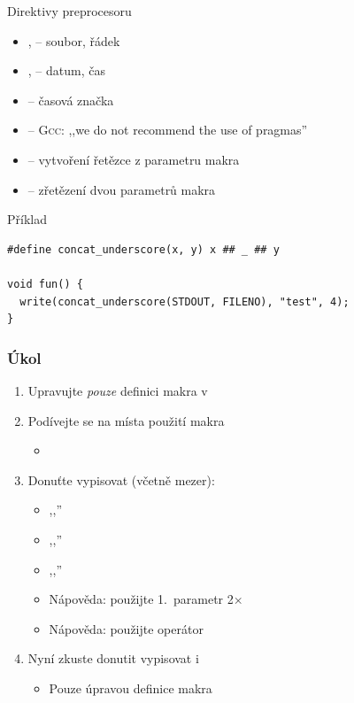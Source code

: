 \begin{frame}[fragile]{Direktivy preprocesoru}

  \begin{itemize}[<+->]
    \item {},  -- soubor, řádek
    \item {},  -- datum, čas
    \item {} -- časová značka
    \item {} -- \textsc{Gcc}: ,,we do not recommend the use of
      pragmas''

    \pause

    \item {} -- vytvoření řetězce z parametru makra
    \item {} -- zřetězení dvou parametrů makra
  \end{itemize}

  \begin{block}{Příklad}
    \begin{lstlisting}
#define concat_underscore(x, y) x ## _ ## y

void fun() {
  write(concat_underscore(STDOUT, FILENO), "test", 4);
}
    \end{lstlisting}
  \end{block}

\end{frame}

\begin{frame}
  \frametitle{Úkol}

  \begin{enumerate}
    \item Upravujte \emph{pouze} definici makra  v 
    \item Podívejte se na místa použití makra 
    \begin{itemize}
      \item {}
    \end{itemize}
    \item Donuťte  vypisovat (včetně mezer):
    \begin{itemize}
      \item ,,''
      \item ,,''
      \item ,,''
      \item Nápověda: použijte 1.\ parametr 2$\times$
      \item Nápověda: použijte operátor \code{\#}
    \end{itemize}

    \item Nyní zkuste donutit  vypisovat i 
    \begin{itemize}
      \item Pouze úpravou definice makra 
    \end{itemize}
  \end{enumerate}

\end{frame}

